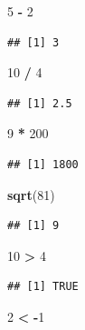 \documentclass[]{book}
\newenvironment{Shaded}{\begin{snugshade}}{\end{snugshade}}
\newcommand{\KeywordTok}[1]{\textcolor[rgb]{0.13,0.29,0.53}{\textbf{#1}}}
\newcommand{\DecValTok}[1]{\textcolor[rgb]{0.00,0.00,0.81}{#1}}
\newcommand{\StringTok}[1]{\textcolor[rgb]{0.31,0.60,0.02}{#1}}
\newcommand{\OperatorTok}[1]{\textcolor[rgb]{0.81,0.36,0.00}{\textbf{#1}}}
\newcommand{\NormalTok}[1]{#1}
\theoremstyle{definition}
\theoremstyle{definition}
\theoremstyle{definition}
\theoremstyle{remark}
\begin{document}
\begin{Shaded}
\begin{Highlighting}[]
\DecValTok{5} \OperatorTok{-}\StringTok{ }\DecValTok{2}
\end{Highlighting}
\end{Shaded}

\begin{verbatim}
## [1] 3
\end{verbatim}

\begin{Shaded}
\begin{Highlighting}[]
\DecValTok{10} \OperatorTok{/}\StringTok{ }\DecValTok{4}
\end{Highlighting}
\end{Shaded}

\begin{verbatim}
## [1] 2.5
\end{verbatim}

\begin{Shaded}
\begin{Highlighting}[]
\DecValTok{9} \OperatorTok{*}\StringTok{ }\DecValTok{200}
\end{Highlighting}
\end{Shaded}

\begin{verbatim}
## [1] 1800
\end{verbatim}

\begin{Shaded}
\begin{Highlighting}[]
\KeywordTok{sqrt}\NormalTok{(}\DecValTok{81}\NormalTok{)}
\end{Highlighting}
\end{Shaded}

\begin{verbatim}
## [1] 9
\end{verbatim}

\begin{Shaded}
\begin{Highlighting}[]
\DecValTok{10} \OperatorTok{>}\StringTok{ }\DecValTok{4}
\end{Highlighting}
\end{Shaded}

\begin{verbatim}
## [1] TRUE
\end{verbatim}

\begin{Shaded}
\begin{Highlighting}[]
\DecValTok{2} \OperatorTok{<}\StringTok{ }\OperatorTok{-}\DecValTok{1}
\end{Highlighting}
\end{Shaded}
\end{document}
